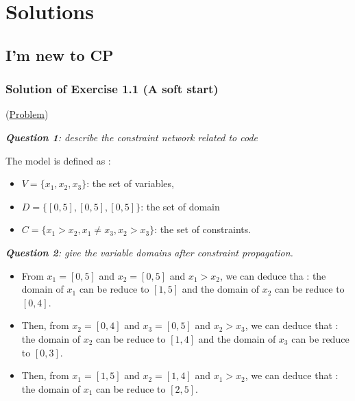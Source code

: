 \label{solutions}
\hypertarget{solutions}{}

\chapter{Solutions}\label{solutions:solutions}\hypertarget{solutions:solutions}{}

\section{I'm new to CP}\label{solutions:i'mnewtocp}\hypertarget{solutions:i'mnewtocp}{}

\subsection{Solution of Exercise 1.1 (A soft start)}\label{solutions:solutionofexercise1.1}\hypertarget{solutions:solutionofexercise1.1}{}
(\hyperlink{exercises:exercise1.1}{Problem})

\noindent\emph{\textbf{Question 1}: describe the constraint network related to code}

The model is defined as :
\begin{itemize}
	\item $V = \{x_1, x_2, x_3\}$: the set of variables,
	\item $D = \{[0,5], [0,5], [0,5]\}$: the set of domain
	\item $C = \{x_1>x_2, x_1\neq x_3, x_2>x_3\}$: the set of constraints.
\end{itemize}

\noindent\emph{\textbf{Question 2}: give the variable domains after constraint propagation.}

\begin{itemize}
	\item From $x_1 = [0,5]$ and $x_2 = [0,5]$ and $x_1>x_2$, we can deduce tha : the domain of $x_1$ can be reduce to $[1,5]$ and the domain of $x_2$ can be reduce to $[0,4]$.
	\item Then, from $x_2 = [0,4]$ and $x_3 = [0,5]$ and $x_2>x_3$, we can deduce that : the domain of $x_2$ can be reduce to $[1,4]$ and the domain of $x_3$ can be reduce to $[0,3]$.
	\item Then, from $x_1 = [1,5]$ and $x_2 = [1,4]$ and $x_1>x_2$, we can deduce that : the domain of $x_1$ can be reduce to $[2,5]$.
\end{itemize}

